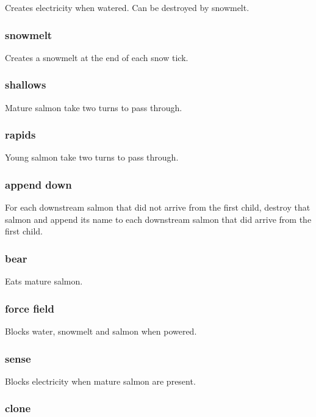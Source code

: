\documentclass[10pt]{article}
\begin{document}
Creates electricity when watered. Can be destroyed by snowmelt.

\subsubsection{snowmelt}

Creates a snowmelt at the end of each snow tick.

\subsubsection{shallows}

Mature salmon take two turns to pass through.

\subsubsection{rapids}

Young salmon take two turns to pass through.

\subsubsection{append down}

For each downstream salmon that did not arrive from the first child, destroy that salmon and append its name
to each downstream salmon that did arrive from the first child.

\subsubsection{bear}

Eats mature salmon.

\subsubsection{force field}

Blocks water, snowmelt and salmon when powered.

\subsubsection{sense}

Blocks electricity when mature salmon are present.

\subsubsection{clone}
\end{document}

